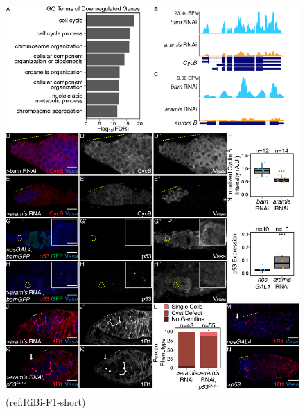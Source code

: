 \documentclass[12pt,oneside]{reedthesis}
\begin{document}
\begin{figure}

{\centering \includegraphics[width=6.5 in,height=8.9375 in]{./figure/Ribosome Biogenesis/Ribosome Biogenesis 3} 

}

\caption[(ref:RiBi-F1-short)]{(ref:RiBi-F1-short)}\label{fig:unnamed-chunk-10}
\end{figure}
\end{document}
